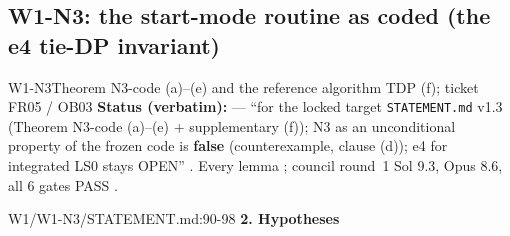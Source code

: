 \subsection{W1-N3: the start-mode routine as coded (the e4 tie-DP invariant)}\label{sec:loop:n3}
\begin{card}{W1-N3}{Theorem N3-code (a)–(e) and the reference algorithm TDP (f); ticket FR05 / OB03}
\textbf{Status (verbatim):}  — ``for the locked target \texttt{STATEMENT.md} v1.3 (Theorem N3-code (a)–(e) + supplementary (f)); N3 as an unconditional property of the frozen code is \textbf{false} (counterexample, clause (d)); e4 for integrated LS0 stays OPEN'' . Every lemma ; council round~1 Sol 9.3, Opus 8.6, all 6 gates PASS .
\begin{stmt}{W1/W1-N3/STATEMENT.md:90-98}
\textbf{2. Hypotheses}


\end{stmt}
\end{card}
